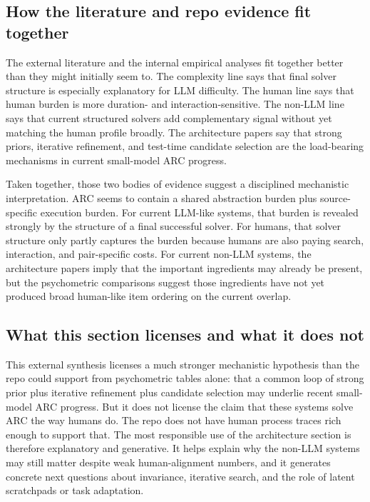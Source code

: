 \subsection{How the literature and repo evidence fit together}

The external literature and the internal empirical analyses fit together better than they might initially seem to. The complexity line says that final solver structure is especially explanatory for LLM difficulty. The human line says that human burden is more duration- and interaction-sensitive. The non-LLM line says that current structured solvers add complementary signal without yet matching the human profile broadly. The architecture papers say that strong priors, iterative refinement, and test-time candidate selection are the load-bearing mechanisms in current small-model ARC progress.

Taken together, those two bodies of evidence suggest a disciplined mechanistic interpretation. ARC seems to contain a shared abstraction burden plus source-specific execution burden. For current LLM-like systems, that burden is revealed strongly by the structure of a final successful solver. For humans, that solver structure only partly captures the burden because humans are also paying search, interaction, and pair-specific costs. For current non-LLM systems, the architecture papers imply that the important ingredients may already be present, but the psychometric comparisons suggest those ingredients have not yet produced broad human-like item ordering on the current overlap.

\subsection{What this section licenses and what it does not}

This external synthesis licenses a much stronger mechanistic hypothesis than the repo could support from psychometric tables alone: that a common loop of strong prior plus iterative refinement plus candidate selection may underlie recent small-model ARC progress. But it does not license the claim that these systems solve ARC the way humans do. The repo does not have human process traces rich enough to support that. The most responsible use of the architecture section is therefore explanatory and generative. It helps explain why the non-LLM systems may still matter despite weak human-alignment numbers, and it generates concrete next questions about invariance, iterative search, and the role of latent scratchpads or task adaptation.

